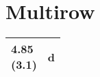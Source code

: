 \documentclass[10pt, a4paper]{article}
\begin{document}
\section{Multirow}

\begin{tabular}{ll}
\hline
  \makecell{4.85 \\ (3.1)} & d \\
\hline
\end{tabular}
\end{document}
